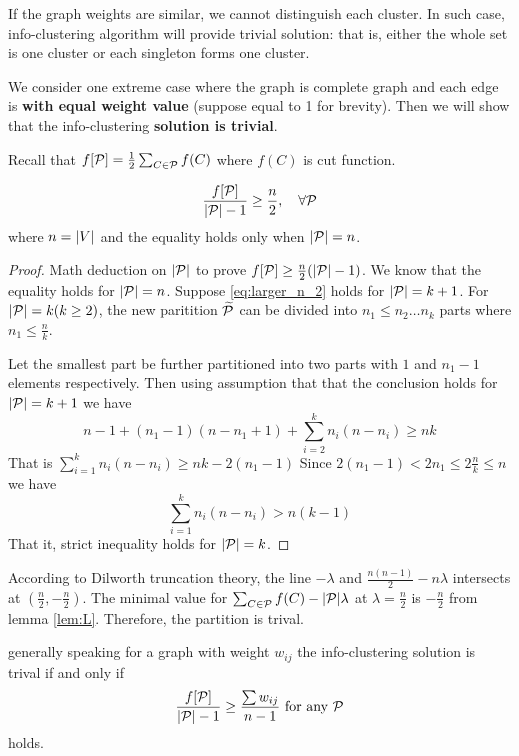 \documentclass{article}
\begin{document}
If the graph weights are similar, we cannot distinguish each cluster. 
In such case, info-clustering algorithm will provide trivial solution: 
that is, either the whole set is one cluster or each singleton forms one cluster.

We consider one extreme case where the graph is complete graph and each edge is \textbf{with equal weight value} (suppose equal to 1 for brevity).
Then we will show that the info-clustering \textbf{solution is trivial}.

Recall that $f[\P] = \frac{1}{2}\sum_{C\in\P} f(C)$ where $f(C)$ is cut function.
\begin{lemma}\label{lem:L}
\begin{equation}\label{eq:larger_n_2}
\frac{f[\P]}{\abs{\P}-1} \geq \frac{n}{2}, \quad\forall \P
\end{equation}
where $n = \abs{V}$ and the equality holds only when $\abs{\P}=n$.
\end{lemma}
\begin{proof}
Math deduction on $\abs{\P}$ to prove $f[\P] \geq \frac{n}{2}(\abs{\P} - 1)$.  We know that the equality holds for $\abs{\P} = n$.
Suppose \eqref{eq:larger_n_2} holds for $\abs{\P} =k+1$. For $\abs{\P}=k(k\geq 2)$, the new paritition $\widetilde{\P}$ can be divided into $n_1\leq n_2 \dots n_k$ parts where $n_1 \leq \frac{n}{k}$.

Let the smallest part be further partitioned into two parts with $1$ and $n_1-1$ elements respectively.
Then using assumption that that the conclusion holds for $\abs{\P}=k+1$ we have
$$
n-1 + (n_1-1)(n-n_1+1) + \sum_{i=2}^k n_i(n-n_i) \geq nk
$$
That is $\sum_{i=1}^k n_i(n-n_i) \geq nk - 2(n_1-1)$
Since $2(n_1-1)<2n_1\leq 2\frac{n}{k} \leq n$ we have
$$
 \sum_{i=1}^k n_i(n-n_i)  > n(k-1)
$$
That it, strict inequality holds for $\abs{\P}=k$.
\end{proof}
According to Dilworth truncation theory, the line $-\lambda$ and $\frac{n(n-1)}{2} - n\lambda$ intersects at $(\frac{n}{2}, -\frac{n}{2})$. The minimal value for $\sum_{C\in\P}f(C) -\abs{\P}\lambda$ at $\lambda = \frac{n}{2}$ is $-\frac{n}{2}$ from lemma \ref{lem:L}. Therefore, the partition is trival.

generally speaking for a graph with weight $w_{ij}$ the info-clustering solution is trival if and only if
\begin{equation}\label{eq:GF}
\frac{f[\P]}{\abs{\P}-1} \geq \frac{\sum w_{ij}}{n-1} \textrm{ for any } \P
\end{equation}
holds.
\end{document}

